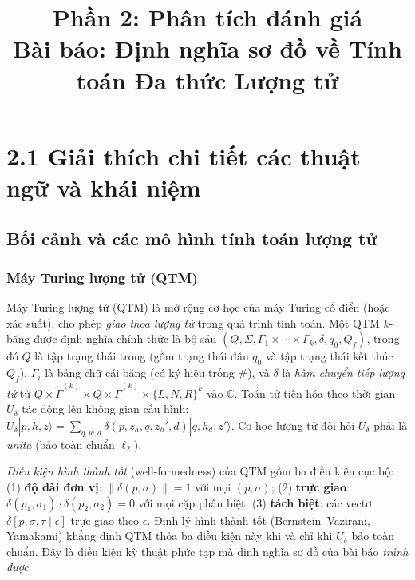 \documentclass[10pt]{article}
\title{Phần 2: Phân tích đánh giá\\[0.5em]
{\large Bài báo: Định nghĩa sơ đồ về Tính toán Đa thức Lượng tử}}
\author{}
\date{}
\begin{document}
\maketitle

\section*{2.1 Giải thích chi tiết các thuật ngữ và khái niệm}

\subsection*{Bối cảnh và các mô hình tính toán lượng tử}

\subsubsection*{Máy Turing lượng tử (QTM)}
Máy Turing lượng tử (QTM) là mở rộng cơ học của máy Turing cổ điển (hoặc xác suất), cho phép \emph{giao thoa lượng tử} trong quá trình tính toán. Một QTM $k$-băng được định nghĩa chính thức là bộ sáu $(Q,\Sigma,\Gamma_1\times\cdots\times\Gamma_k,\delta,q_0,Q_f)$, trong đó $Q$ là tập trạng thái trong (gồm trạng thái đầu $q_0$ và tập trạng thái kết thúc $Q_f$), $\Gamma_i$ là bảng chữ cái băng (có ký hiệu trống $\#$), và $\delta$ là \emph{hàm chuyển tiếp lượng tử} từ $Q\times\tilde{\Gamma}^{(k)}\times Q\times\tilde{\Gamma}^{(k)}\times\{L,N,R\}^k$ vào $\mathbb{C}$. Toán tử tiến hóa theo thời gian $U_\delta$ tác động lên không gian cấu hình: $U_\delta|p,h,z\rangle=\sum_{q,w,d}\delta(p,z_h,q,z_h',d)|q,h_d,z'\rangle$. Cơ học lượng tử đòi hỏi $U_\delta$ phải là \emph{unita} (bảo toàn chuẩn $\ell_2$).

\emph{Điều kiện hình thành tốt} (well-formedness) của QTM gồm ba điều kiện cục bộ: (1) \textbf{độ dài đơn vị}: $\|\delta(p,\sigma)\|=1$ với mọi $(p,\sigma)$; (2) \textbf{trực giao}: $\delta(p_1,\sigma_1)\cdot\delta(p_2,\sigma_2)=0$ với mọi cặp phân biệt; (3) \textbf{tách biệt}: các vectơ $\delta[p,\sigma,\tau\mid\epsilon]$ trực giao theo $\epsilon$. Định lý hình thành tốt (Bernstein–Vazirani, Yamakami) khẳng định QTM thỏa ba điều kiện này khi và chỉ khi $U_\delta$ bảo toàn chuẩn. Đây là điều kiện kỹ thuật phức tạp mà định nghĩa sơ đồ của bài báo \emph{tránh được}.
\end{document}
